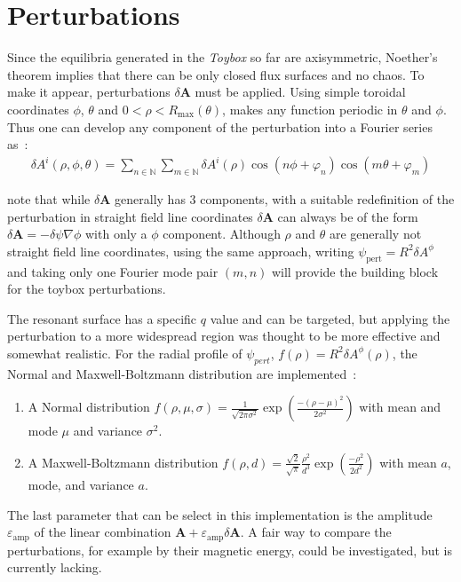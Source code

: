 \section{Perturbations}

Since the equilibria generated in the \textit{Toybox} so far are axisymmetric, Noether's theorem implies that there can be only closed flux surfaces and no chaos. To make it appear, perturbations $\delta\textbf{A}$ must be applied. Using simple toroidal coordinates $\phi$, $\theta$ and $0 < \rho < R_\text{max}(\theta)$, makes any function periodic in $\theta$ and $\phi$. Thus one can develop any component of the perturbation into a Fourier series as~:
\begin{align*}
    \delta A^i(\rho,\phi,\theta) = \sum\limits_{n\in\mathbb{N}}\sum\limits_{m\in\mathbb{N}} \delta A^i(\rho)\cos(n\phi + \varphi_n)\cos(m\theta + \varphi_m)
\end{align*}

\cite{escande_description_2024} note that while $\delta\textbf{A}$ generally has 3 components, with a suitable redefinition of the perturbation in straight field line coordinates $\delta\textbf{A}$ can always be of the form $\delta\textbf{A} = -\delta\psi \nabla\phi$ with only a $\phi$ component. Although $\rho$ and $\theta$ are generally not straight field line coordinates, using the same approach, writing $\psi_\text{pert} = R^2\delta A^\phi$ and taking only one Fourier mode pair $(m,n)$ will provide the building block for the toybox perturbations.

The resonant surface has a specific $q$ value and can be targeted, but applying the perturbation to a more widespread region was thought to be more effective and somewhat realistic. For the radial profile of $\psi_{pert}$,  $f(\rho) = R^2\delta A^\phi(\rho)$, the Normal and Maxwell-Boltzmann distribution are implemented~:
\begin{enumerate}
    \item A Normal distribution $f(\rho, \mu, \sigma) = \frac{1}{\sqrt{2\pi\sigma^2}}\exp\left(\frac{-(\rho-\mu)^2}{2\sigma^2}\right)$ with mean  and mode $\mu$ and variance $\sigma^2$.
    \item A Maxwell-Boltzmann distribution $f(\rho, d) = \frac{\sqrt{2}}{\sqrt{\pi}}\frac{\rho^2}{d^3}\exp\left(\frac{-\rho^2}{2d^2}\right)$ with mean $a$, mode, and variance $a$.
\end{enumerate}
\newcommand{\amp}{\varepsilon_\text{amp}}
The last parameter that can be select in this implementation is the amplitude $\amp$ of the linear combination $\textbf{A} + \amp\delta\textbf{A}$. A fair way to compare the perturbations, for example by their magnetic energy, could be investigated, but is currently lacking.

